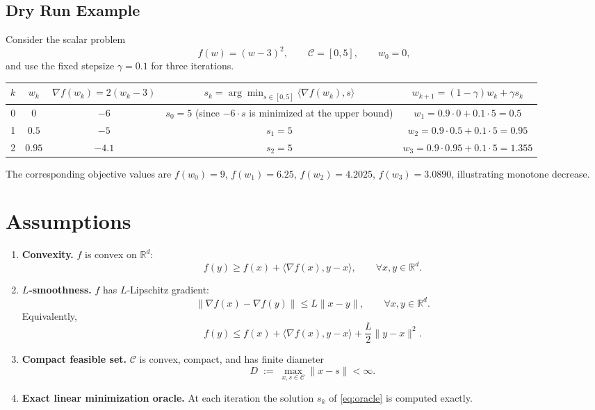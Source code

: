 \documentclass{article}
\begin{document}
\subsection*{Dry Run Example}
Consider the scalar problem
\[
f(w) = (w-3)^2,\qquad \mathcal{C}= [0,5],\qquad w_0 = 0,
\]
and use the fixed stepsize $\gamma = 0.1$ for three iterations.

\begin{center}
\begin{tabular}{c|c|c|c|c}
$k$ & $w_k$ & $\nabla f(w_k)=2(w_k-3)$ & $s_k=\arg\min_{s\in[0,5]}\langle\nabla f(w_k),s\rangle$ & $w_{k+1}=(1-\gamma)w_k+\gamma s_k$\\\hline
0 & $0$ & $-6$ & $\displaystyle s_0=5$ (since $-6\cdot s$ is minimized at the upper bound) & $w_1=0.9\cdot0+0.1\cdot5=0.5$\\[4pt]
1 & $0.5$ & $-5$ & $s_1=5$ & $w_2=0.9\cdot0.5+0.1\cdot5=0.95$\\[4pt]
2 & $0.95$ & $-4.1$ & $s_2=5$ & $w_3=0.9\cdot0.95+0.1\cdot5=1.355$\\[4pt]
\end{tabular}
\end{center}
The corresponding objective values are $f(w_0)=9$, $f(w_1)=6.25$, $f(w_2)=4.2025$, $f(w_3)=3.0890$, illustrating monotone decrease.

\section*{Assumptions}
\begin{enumerate}[label=(A\arabic*)]
\item \label{assump:convex} \textbf{Convexity.} $f$ is convex on $\mathbb{R}^d$:
\[
f(y)\ge f(x)+\langle\nabla f(x),y-x\rangle,\qquad\forall x,y\in\mathbb{R}^d .
\]
\item \label{assump:smooth} \textbf{$L$‑smoothness.} $f$ has $L$‑Lipschitz gradient:
\[
\|\nabla f(x)-\nabla f(y)\| \le L\|x-y\|,\qquad\forall x,y\in\mathbb{R}^d .
\]
Equivalently,
\[
f(y) \le f(x)+\langle\nabla f(x),y-x\rangle+\frac{L}{2}\|y-x\|^2 .
\tag{1}
\]
\item \label{assump:compact} \textbf{Compact feasible set.} $\mathcal{C}$ is convex, compact, and has finite diameter
\[
D \;:=\; \max_{x,s\in\mathcal{C}}\|x-s\| <\infty .
\]
\item \label{assump:oracle} \textbf{Exact linear minimization oracle.} At each iteration the solution $s_k$ of \eqref{eq:oracle} is computed exactly.
\end{enumerate}
\end{document}
